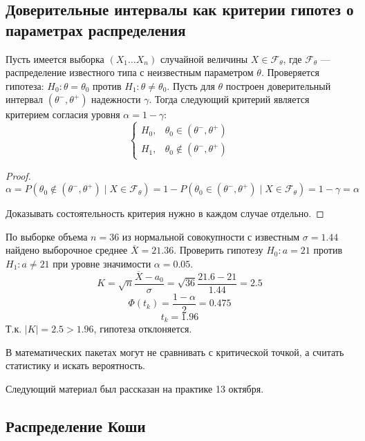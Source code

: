 \subsection{Доверительные интервалы как критерии гипотез о параметрах распределения}

Пусть имеется выборка \((X_1 \dots X_n)\) случайной величины \(X \in \mathcal{F}_\theta\), где \(\mathcal{F}_\theta\) --- распределение известного типа с неизвестным параметром \(\theta\). Проверяется гипотеза: \(H_0 : \theta = \theta_0\) против \(H_1 : \theta \neq \theta_0\). Пусть для \(\theta\) построен доверительный интервал \((\theta^- , \theta^+)\) надежности \(\gamma\). Тогда следующий критерий является критерием согласия уровня \(\alpha = 1 - \gamma\):
\[\begin{cases}
        H_0, & \theta_0 \in (\theta^- , \theta^+)    \\
        H_1, & \theta_0 \notin (\theta^- , \theta^+)
    \end{cases}\]
\begin{proof}
    \[\alpha = P(\theta_0 \notin (\theta^- , \theta^+) \mid X \in \mathcal{F}_\theta) = 1 - P(\theta_0 \in (\theta^- , \theta^+) \mid X \in \mathcal{F}_\theta) = 1 - \gamma = \alpha\]

    Доказывать состоятельность критерия нужно в каждом случае отдельно.
\end{proof}

\begin{example}
    По выборке объема \(n = 36\) из нормальной совокупности с известным \(\sigma = 1.44\) найдено выборочное среднее \(\overline{X} = 21.36\). Проверить гипотезу \(H_0 : a = 21\) против \(H_1 : a \neq 21\) при уровне значимости \(\alpha = 0.05\).
    \[K = \sqrt{n} \frac{ \overline{X} - a_0}{\sigma} = \sqrt{36} \frac{21.6 - 21}{1.44} = 2.5\]
    \[\Phi(t_k) = \frac{1 - \alpha}{2} = 0.475\]
    \[t_k = 1.96\]
    Т.к. \(|K| = 2.5 > 1.96\), гипотеза отклоняется.
\end{example}

В математических пакетах могут не сравнивать с критической точкой, а считать статистику и искать вероятность.

\begin{remark}
    Следующий материал был рассказан на практике 13 октября.
\end{remark}

\subsection{Распределение Коши}

